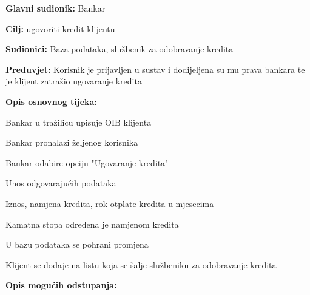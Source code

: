                 
                
                 \noindent {}
                \begin{packed_item}
                	
                	\item \textbf{Glavni sudionik: }Bankar
                	\item  \textbf{Cilj:} ugovoriti kredit klijentu
                	\item  \textbf{Sudionici:} Baza podataka, službenik za odobravanje kredita
                	\item  \textbf{Preduvjet:} Korisnik je prijavljen u sustav i dodijeljena su mu prava bankara te je klijent zatražio ugovaranje kredita
                	\item  \textbf{Opis osnovnog tijeka:}
                	
                	\item[] \begin{packed_enum}
                		
                		\item Bankar u tražilicu upisuje OIB klijenta
                		\item Bankar pronalazi željenog korisnika
                		\item Bankar odabire opciju "Ugovaranje kredita"
                		\item Unos odgovarajućih podataka
                		\begin{packed_enum}
                			\item Iznos, namjena kredita, rok otplate kredita u mjesecima
                			\item Kamatna stopa određena je namjenom kredita
                		\end{packed_enum}
                		\item U bazu podataka se pohrani promjena 
                		\item Klijent se dodaje na listu koja se šalje službeniku za odobravanje kredita
                	\end{packed_enum}
                	
                	\item  \textbf{Opis mogućih odstupanja:} 
                	
                	\item[] \begin{packed_item}
                		

\end{packed_item}
\end{packed_item}
